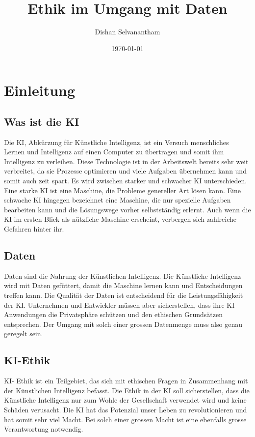 \documentclass{report}
\title{Ethik im Umgang mit Daten}
\author{Dishan Selvanantham}
\date{\today}
\begin{document}
\maketitle


\tableofcontents

\chapter{Einleitung}

\section{Was ist die KI}

Die KI, Abkürzung für Künstliche Intelligenz, ist ein Versuch menschliches Lernen und Intelligenz auf einen Computer zu übertragen und somit ihm Intelligenz zu verleihen. Diese Technologie ist in der Arbeitswelt bereits sehr weit verbreitet, da sie Prozesse optimieren und viele Aufgaben übernehmen kann und somit auch zeit spart. Es wird zwischen starker und schwacher KI unterschieden. Eine starke KI ist eine Maschine, die Probleme genereller Art lösen kann. Eine schwache KI hingegen bezeichnet eine Maschine, die nur spezielle Aufgaben bearbeiten kann und die Lösungswege vorher selbstständig erlernt. Auch wenn die KI im ersten Blick als nützliche Maschine erscheint, verbergen sich zahlreiche Gefahren hinter ihr.

\section{Daten}

Daten sind die Nahrung der Künstlichen Intelligenz. Die Künstliche Intelligenz wird mit Daten gefüttert, damit die Maschine lernen kann und Entscheidungen treffen kann. Die Qualität der Daten ist entscheidend für die Leistungsfähigkeit der KI. Unternehmen und Entwickler müssen aber sicherstellen, dass ihre KI- Anwendungen die Privatsphäre schützen und den ethischen Grundsätzen entsprechen. Der Umgang mit solch einer grossen Datenmenge muss also genau geregelt sein.

\section{KI-Ethik}

KI- Ethik ist ein Teilgebiet, das sich mit ethischen Fragen in Zusammenhang mit der Künstlichen Intelligenz befasst. Die Ethik in der KI soll sicherstellen, dass die Künstliche Intelligenz nur zum Wohle der Gesellschaft verwendet wird und keine Schäden verusacht. Die KI hat das Potenzial unser Leben zu revolutionieren und hat somit sehr viel Macht. Bei solch einer grossen Macht ist eine ebenfalls grosse Verantwortung notwendig.







\printbibliography
\end{document}
